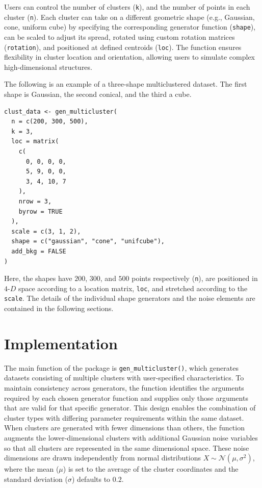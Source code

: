 Users can control the number of clusters (\texttt{k}), and the number of points in each cluster (\texttt{n}). Each cluster can take on a different geometric shape (e.g., Gaussian, cone, uniform cube) by specifying the corresponding generator function (\texttt{shape}), can be scaled to adjust its spread, rotated using custom rotation matrices (\texttt{rotation}), and positioned at defined centroids (\texttt{loc}). The function ensures flexibility in cluster location and orientation, allowing users to simulate complex high-dimensional structures.

The following is an example of a three-shape multiclustered dataset. The first shape is Gaussian, the second conical, and the third a cube.

\begin{verbatim}
clust_data <- gen_multicluster(
  n = c(200, 300, 500),
  k = 3,
  loc = matrix(
    c(
      0, 0, 0, 0,
      5, 9, 0, 0,
      3, 4, 10, 7
    ),
    nrow = 3,
    byrow = TRUE
  ),
  scale = c(3, 1, 2),
  shape = c("gaussian", "cone", "unifcube"),
  add_bkg = FALSE
)
\end{verbatim}

Here, the shapes have \(200\), \(300\), and \(500\) points respectively (\texttt{n}), are positioned in \(4\text{-}D\) space according to a location matrix, \texttt{loc}, and stretched according to the \texttt{scale}. The details of the individual shape generators and the noise elements are contained in the following sections.

\section{Implementation}\label{implementation}

The main function of the package is \texttt{gen\_multicluster()}, which generates datasets consisting of multiple clusters with user-specified characteristics.
To maintain consistency across generators, the function identifies the arguments required by each chosen generator function and supplies only those arguments that are valid for that specific generator. This design enables the combination of cluster types with differing parameter requirements within the same dataset. When clusters are generated with fewer dimensions than others, the function augments the lower-dimensional clusters with additional Gaussian noise variables so that all clusters are represented in the same dimensional space. These noise dimensions are drawn independently from normal distributions \(X \sim \mathcal{N}(\mu, \sigma^2)\), where the mean (\(\mu\)) is set to the average of the cluster coordinates and the standard deviation (\(\sigma\)) defaults to \(0.2\).

